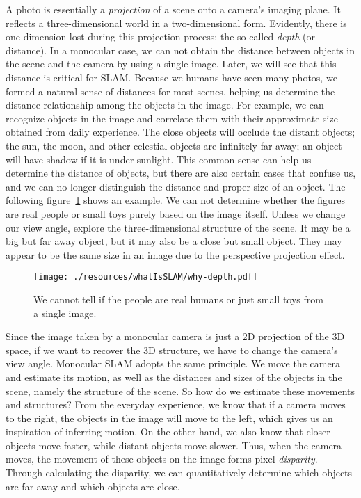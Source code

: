 A photo is essentially a \textit{projection} of a scene onto a camera's imaging plane. It reflects a three-dimensional world in a two-dimensional form. Evidently, there is one dimension lost during this projection process: the so-called \textit{depth} (or distance). In a monocular case, we can not obtain the distance between objects in the scene and the camera by using a single image. Later, we will see that this distance is critical for SLAM. Because we humans have seen many photos, we formed a natural sense of distances for most scenes, helping us determine the distance relationship among the objects in the image. For example, we can recognize objects in the image and correlate them with their approximate size obtained from daily experience. The close objects will occlude the distant objects; the sun, the moon, and other celestial objects are infinitely far away; an object will have shadow if it is under sunlight. This common-sense can help us determine the distance of objects, but there are also certain cases that confuse us, and we can no longer distinguish the distance and proper size of an object. The following figure~\ref{fig:why-depth} shows an example. We can not determine whether the figures are real people or small toys purely based on the image itself. Unless we change our view angle, explore the three-dimensional structure of the scene. It may be a big but far away object, but it may also be a close but small object. They may appear to be the same size in an image due to the perspective projection effect.

\begin{figure}
	\centering
	\texttt{[image: ./resources/whatIsSLAM/why-depth.pdf]}
	\caption{We cannot tell if the people are real humans or just small toys from a single image.}
	\label{fig:why-depth}
\end{figure}

Since the image taken by a monocular camera is just a 2D projection of the 3D space, if we want to recover the 3D structure, we have to change the camera's view angle. Monocular SLAM adopts the same principle. We move the camera and estimate its motion, as well as the distances and sizes of the objects in the scene, namely the structure of the scene. So how do we estimate these movements and structures? From the everyday experience, we know that if a camera moves to the right, the objects in the image will move to the left, which gives us an inspiration of inferring motion. On the other hand, we also know that closer objects move faster, while distant objects move slower. Thus, when the camera moves, the movement of these objects on the image forms pixel \textit{disparity}. Through calculating the disparity, we can quantitatively determine which objects are far away and which objects are close.

